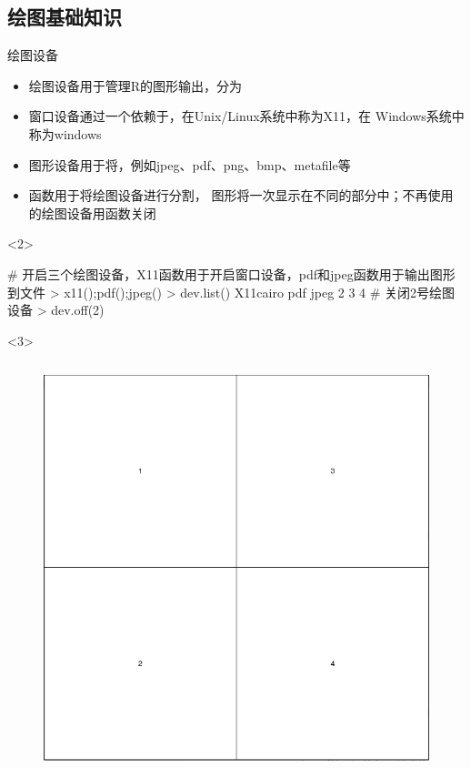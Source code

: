 \documentclass{beamerthemeMono}
\begin{document}
\subsection{绘图基础知识}
\begin{frame}[t, fragile]{\subsecname}{绘图设备}
  \begin{itemize}
  \item<1-> 绘图设备用于管理R的图形输出，分为
  \item<2-> 窗口设备通过一个依赖于，在Unix/Linux系统中称为X11，在
        Windows系统中称为windows
  \item<2-> 图形设备用于将，例如jpeg、pdf、png、bmp、metafile等
  \item<3-> 函数用于将绘图设备进行分割，
            图形将一次显示在不同的部分中；不再使用的绘图设备用函数关闭 
  \end{itemize} 

\begin{overlayarea}{\textwidth}{\textheight}
\begin{onlyenv}<2>
\begin{rcode}
# 开启三个绘图设备，X11函数用于开启窗口设备，pdf和jpeg函数用于输出图形到文件
> x11();pdf();jpeg()
> dev.list()
X11cairo      pdf     jpeg 
       2        3        4 
# 关闭2号绘图设备
> dev.off(2) 
\end{rcode}  
\end{onlyenv}

\begin{onlyenv}<3>
      \begin{columns}
        \begin{column}{.4\textwidth}
          \begin{figure}
            \centering
            \includegraphics[width=0.8\columnwidth]{layout.png}
          \end{figure}
        \end{column}


\end{columns}
\end{onlyenv}
\end{overlayarea}
\end{frame}
\end{document}
